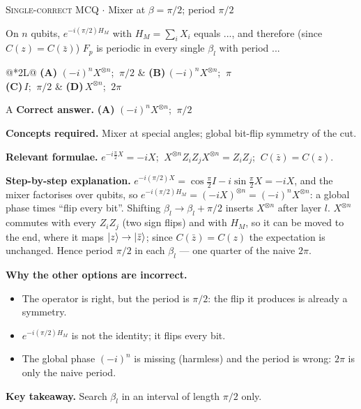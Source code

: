 \documentclass[11pt,a4paper]{article}
\newcommand{\optlabel}[1]{\textbf{(#1)}}
\newcommand{\correctlabel}[1]{\textcolor{okgreen}{\textbf{(#1)}\,\ding{51}}}
\newenvironment{qitem}[1]{\begin{list}{}{\setlength{\leftmargin}{3.3em}\setlength{\labelwidth}{3.1em}%
  \setlength{\labelsep}{0.2em}\setlength{\topsep}{3pt}\setlength{\parsep}{3pt}}\item[\textbf{Q.#1}\hfill]}{\end{list}}
\newcommand{\qsep}{\par\vspace{2pt}{\color{black!15}\hrule}\vspace{4pt}}
\newcommand{\qmeta}[2]{{\footnotesize\color{black!60}\textsc{#1} \;$\cdot$\; #2}\par}
\begin{document}
\begin{qitem}{37}
\qmeta{Single-correct MCQ}{Mixer at $\beta = \pi/2$; period $\pi/2$}
On $n$ qubits, $e^{-i(\pi/2) H_M}$ with $H_M = \sum_i X_i$ equals ..., and therefore (since $C(z) = C(\bar z)$) $F_p$ is
periodic in every single $\beta_l$ with period ...
\par\smallskip\noindent\begin{tabularx}{\linewidth}{@{}*{2}{L}@{}}
\correctlabel{A}\,$(-i)^n X^{\otimes n}$; $\ \pi/2$ & \optlabel{B}\,$(-i)^n X^{\otimes n}$; $\ \pi$ \\[3pt]
\optlabel{C}\,$I$; $\ \pi/2$ & \optlabel{D}\,$X^{\otimes n}$; $\ 2\pi$
\end{tabularx}
\end{qitem}
\begin{solbox}{A}
\textbf{\color{brand}Correct answer.} \textcolor{okgreen}{\textbf{(A)}} $(-i)^n X^{\otimes n}$; $\ \pi/2$

\textbf{\color{brand}Concepts required.} Mixer at special angles; global bit-flip symmetry of the cut.

\textbf{\color{brand}Relevant formulae.} $e^{-i\frac\pi2X} = -iX$; $\ X^{\otimes n}Z_iZ_jX^{\otimes n} = Z_iZ_j$; $\ C(\bar z) = C(z)$.

\textbf{\color{brand}Step-by-step explanation.} $e^{-i(\pi/2)X} = \cos\tfrac\pi2 I - i\sin\tfrac\pi2 X = -iX$, and the mixer factorises over qubits, so
$e^{-i(\pi/2)H_M} = (-iX)^{\otimes n} = (-i)^n X^{\otimes n}$: a global phase times ``flip every bit''.
Shifting $\beta_l \to \beta_l + \pi/2$ inserts $X^{\otimes n}$ after layer $l$. $X^{\otimes n}$ commutes with every $Z_iZ_j$ (two sign
flips) and with $H_M$, so it can be moved to the end, where it maps $\ket z \to \ket{\bar z}$; since $C(\bar z) = C(z)$ the
expectation is unchanged. Hence period $\pi/2$ in each $\beta_l$ --- one quarter of the naive $2\pi$.

\textbf{\color{brand}Why the other options are incorrect.}
\begin{itemize}[leftmargin=2.4em, itemsep=1pt, topsep=2pt]
\item[\textbf{(B)}] The operator is right, but the period is $\pi/2$: the flip it produces is already a symmetry.
\item[\textbf{(C)}] $e^{-i(\pi/2)H_M}$ is not the identity; it flips every bit.
\item[\textbf{(D)}] The global phase $(-i)^n$ is missing (harmless) and the period is wrong: $2\pi$ is only the naive period.
\end{itemize}
\textbf{\color{brand}Key takeaway.} Search $\beta_l$ in an interval of length $\pi/2$ only.
\end{solbox}
\qsep
\end{document}
